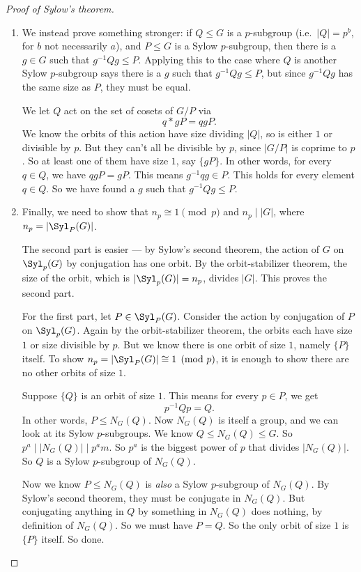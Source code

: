 \documentclass[a4paper]{article}
\begin{document}
\begin{proof}[Proof of Sylow's theorem]
\begin{enumerate}
    \item We instead prove something stronger: if $Q \leq G$ is a $p$-subgroup (i.e.\ $|Q| = p^b$, for $b$ not necessarily $a$), and $P \leq G$ is a Sylow $p$-subgroup, then there is a $g \in G$ such that $g^{-1} Qg \leq P$. Applying this to the case where $Q$ is another Sylow $p$-subgroup says there is a $g$ such that $g^{-1}Qg \leq P$, but since $g^{-1}Qg$ has the same size as $P$, they must be equal.

      We let $Q$ act on the set of cosets of $G/P$ via
      \[
        q * gP = qgP.
      \]
      We know the orbits of this action have size dividing $|Q|$, so is either $1$ or divisible by $p$. But they can't all be divisible by $p$, since $|G/P|$ is coprime to $p$. So at least one of them have size $1$, say $\{gP\}$. In other words, for every $q \in Q$, we have $qgP = gP$. This means $g^{-1}qg \in P$. This holds for every element $q \in Q$. So we have found a $g$ such that $g^{-1}Qg \leq P$.

    \item Finally, we need to show that $n_p \cong 1 \pmod p$ and $n_p \mid |G|$, where $n_p = |\Syl_P(G)|$.

      The second part is easier --- by Sylow's second theorem, the action of $G$ on $\Syl_p(G)$ by conjugation has one orbit. By the orbit-stabilizer theorem, the size of the orbit, which is $|\Syl_p(G)| = n_p$, divides $|G|$. This proves the second part.

      For the first part, let $P \in \Syl_P(G)$. Consider the action by conjugation of $P$ on $\Syl_p(G)$. Again by the orbit-stabilizer theorem, the orbits each have size $1$ or size divisible by $p$. But we know there is one orbit of size $1$, namely $\{P\}$ itself. To show $n_p = |\Syl_P(G)| \cong 1\pmod p$, it is enough to show there are no other orbits of size $1$.

      Suppose $\{Q\}$ is an orbit of size $1$. This means for every $p \in P$, we get
      \[
        p^{-1} Qp = Q.
      \]
      In other words, $P \leq N_G(Q)$. Now $N_G(Q)$ is itself a group, and we can look at its Sylow $p$-subgroups. We know $Q \leq N_G(Q) \leq G$. So $p^a \mid |N_G(Q)| \mid p^a m$. So $p^a$ is the biggest power of $p$ that divides $|N_G(Q)|$. So $Q$ is a Sylow $p$-subgroup of $N_G(Q)$.

      Now we know $P \leq N_G(Q)$ is \emph{also} a Sylow $p$-subgroup of $N_G(Q)$. By Sylow's second theorem, they must be conjugate in $N_G(Q)$. But conjugating anything in $Q$ by something in $N_G(Q)$ does nothing, by definition of $N_G(Q)$. So we must have $P = Q$. So the only orbit of size $1$ is $\{P\}$ itself. So done.
  \end{enumerate}
\end{proof}
\end{document}
